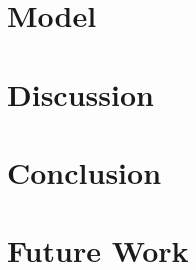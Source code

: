 \documentclass[A4]{scrartcl}
\begin{document}
\newpage
\section{Model}
\label{model}


\newpage
\section{Discussion}
\label{discussion}



\section{Conclusion}
\label{conclusion}


\section{Future Work}
\label{future-work}



\newpage

\printbibliography

\newpage

\appendix


\end{document}
